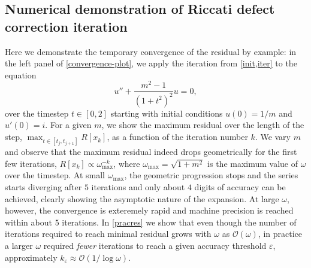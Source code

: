 \documentclass[10pt]{article}
\newcommand{\bigO}{{\mathcal O}}
\newcommand{\om}{\omega}
\newcommand{\AB}[1]{{\color{orange}#1}}
\begin{document}
\subsection{Numerical demonstration of Riccati defect correction iteration}

Here we demonstrate the temporary convergence of the residual by example: in the left panel of \cref{convergence-plot}, we apply
the iteration from \cref{init,iter} to the equation 
\begin{equation}\label{bursteq}
    u'' + \frac{m^2 - 1}{(1+t^2)^2}u = 0,  
\end{equation}
over the timestep $t \in [0, 2]$ starting with initial conditions $u(0) = 1/m$ and
$u'(0) = i$. For a given $m$, we show the maximum residual over the length of
the step, $\max_{t \in [t_j, t_{j+1}]}R[x_k]$, as a function
of the iteration number $k$. We vary $m$ and observe that the maximum residual
indeed drops geometrically for the first few iterations, $R[x_k] \propto
\om_{\text{max}}^{-k}$, where $\om_{\text{max}} = \sqrt{1 + m^2}$ is the
maximum value of $\om$ over the timestep. At small $\om_{\text{max}}$, the
geometric progression stops and the series starts diverging after $5$
iterations and only about $4$ digits of accuracy can be achieved, clearly
showing the asymptotic nature of the expansion. At large $\om$, however, the
convergence is exteremely rapid and machine precision is reached within about
$5$ iterations. In \cref{pracres} we show that even though the number of iterations
required to reach minimal residual grows with $\om$ as $\bigO(\om)$, in
practice a larger $\om$ required \emph{fewer} iterations to reach a given
accuracy threshold $\varepsilon$, approximately $k_{\varepsilon} \approx
\bigO(1/\log\om)$.  
\end{document}
